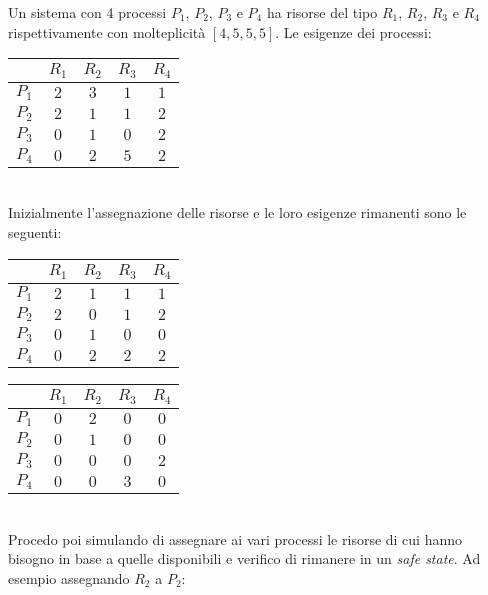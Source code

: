 \begin{example}
	Un sistema con 4 processi $P_1$, $P_2$, $P_3$ e $P_4$ ha risorse del tipo $R_1$, $R_2$, $R_3$ e $R_4$ rispettivamente con molteplicità $[4,5,5,5]$. Le esigenze dei processi:
	\begin{table}[!h]
		\centering
		\begin{tabular}{|c|c|c|c|c|}
			\hline
			& \textbf{$R_1$} & \textbf{$R_2$} & \textbf{$R_3$} & \textbf{$R_4$} \\
			\hline
			\textbf{$P_1$} & $2$ & $3$ & $1$ & $1$ \\
			\hline
			\textbf{$P_2$} & $2$ & $1$ & $1$ & $2$ \\
			\hline
			\textbf{$P_3$} & $0$ & $1$ & $0$ & $2$ \\
			\hline
			\textbf{$P_4$} & $0$ & $2$ & $5$ & $2$ \\
			\hline
		\end{tabular}
	\end{table}\\
	Inizialmente l'assegnazione delle risorse e le loro esigenze rimanenti sono le seguenti:
	\begin{table}[!h]
		\centering
		\begin{tabular}{|c|c|c|c|c|}
			\hline
			& \textbf{$R_1$} & \textbf{$R_2$} & \textbf{$R_3$} & \textbf{$R_4$} \\
			\hline
			\textbf{$P_1$} & $2$ & $1$ & $1$ & $1$ \\
			\hline
			\textbf{$P_2$} & $2$ & $0$ & $1$ & $2$ \\
			\hline
			\textbf{$P_3$} & $0$ & $1$ & $0$ & $0$ \\
			\hline
			\textbf{$P_4$} & $0$ & $2$ & $2$ & $2$ \\
			\hline
		\end{tabular}\quad
		\begin{tabular}{|c|c|c|c|c|}
		\hline
		& \textbf{$R_1$} & \textbf{$R_2$} & \textbf{$R_3$} & \textbf{$R_4$} \\
		\hline
		\textbf{$P_1$} & $0$ & $2$ & $0$ & $0$ \\
		\hline
		\textbf{$P_2$} & $0$ & $1$ & $0$ & $0$ \\
		\hline
		\textbf{$P_3$} & $0$ & $0$ & $0$ & $2$ \\
		\hline
		\textbf{$P_4$} & $0$ & $0$ & $3$ & $0$ \\
		\hline
		\end{tabular}
	\end{table}\\
	Procedo poi simulando di assegnare ai vari processi le risorse di cui hanno bisogno in base a quelle disponibili e verifico di rimanere in un \textit{safe state}. Ad esempio assegnando $R_2$ a $P_2$:

\end{example}
